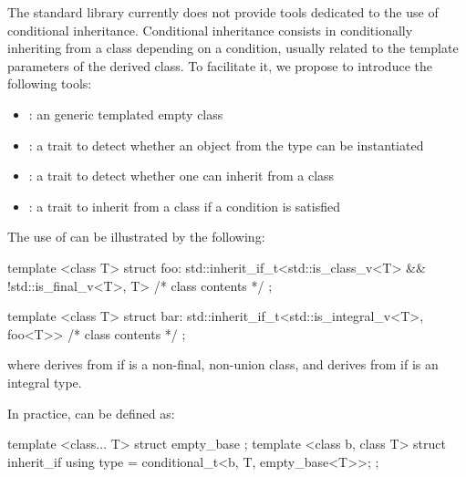 \documentclass[ebook,10pt,oneside,openany,final]{memoir}
\begin{document}
The standard library currently does not provide tools dedicated to the use of conditional inheritance. Conditional inheritance consists in conditionally inheriting from a class depending on a condition, usually related to the template parameters of the derived class. To facilitate it, we propose to introduce the following tools:
\begin{itemize}
\item {}: an generic templated empty class
\item {}: a trait to detect whether an object from the type can be instantiated
\item {}: a trait to detect whether one can inherit from a class
\item {}: a trait to inherit from a class if a condition is satisfied
\end{itemize}

The use of  can be illustrated by the following:
\begin{codeblock}
template <class T>
struct foo: std::inherit_if_t<std::is_class_v<T> && !std::is_final_v<T>, T> {
    /* class contents */
};

template <class T>
struct bar: std::inherit_if_t<std::is_integral_v<T>, foo<T>> {
    /* class contents */
};
\end{codeblock}
where  derives from  if  is a non-final, non-union class, and  derives from  if  is an integral type.

In practice,  can be defined as:
\begin{codeblock}
template <class... T> struct empty_base {};
template <class b, class T> struct inherit_if {
    using type = conditional_t<b, T, empty_base<T>>;
};
\end{codeblock}
\end{document}
